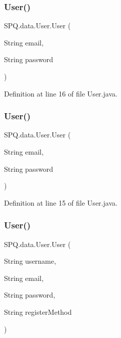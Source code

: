 \subsubsection{\texorpdfstring{User()}{User()}\hspace{0.1cm}{\footnotesize\ttfamily [1/5]}}
{\footnotesize\ttfamily S\+P\+Q.\+data.\+User.\+User (\begin{DoxyParamCaption}\item[{String}]{email,  }\item[{String}]{password }\end{DoxyParamCaption})}



Definition at line 16 of file User.\+java.

\mbox{\label{class_s_p_q_1_1data_1_1_user_acc8d4cd3f95c3da8a14117c6057a3e8b}} 
\subsubsection{\texorpdfstring{User()}{User()}\hspace{0.1cm}{\footnotesize\ttfamily [2/5]}}
{\footnotesize\ttfamily S\+P\+Q.\+data.\+User.\+User (\begin{DoxyParamCaption}\item[{String}]{email,  }\item[{String}]{password }\end{DoxyParamCaption})}



Definition at line 15 of file User.\+java.

\mbox{\label{class_s_p_q_1_1data_1_1_user_a7e0244e513a080fbe8e77cbd07b74e53}} 
\subsubsection{\texorpdfstring{User()}{User()}\hspace{0.1cm}{\footnotesize\ttfamily [3/5]}}
{\footnotesize\ttfamily S\+P\+Q.\+data.\+User.\+User (\begin{DoxyParamCaption}\item[{String}]{username,  }\item[{String}]{email,  }\item[{String}]{password,  }\item[{String}]{register\+Method }\end{DoxyParamCaption})}



